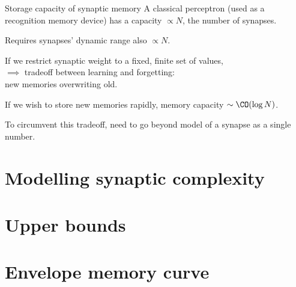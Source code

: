 \documentclass{beamer}%
\begin{document}

\begin{frame}{Storage capacity of synaptic memory}
%
  A classical perceptron (used as a recognition memory device) has a capacity $\propto N$, the number of synapses.

 \vp Requires synapses' dynamic range also $\propto N$.
 
 \vp If we restrict synaptic weight to a fixed, finite set of values,\\ 
 \hp $\implies$ tradeoff between learning and forgetting:\\
 \hp new memories overwriting old.
 
 \vp If we wish to store new memories rapidly, memory capacity  $\sim\CO(\log N)$.
 \\ 

 \vp To circumvent this tradeoff, need to go beyond model of a synapse as a single number.
%
\end{frame}


\section{Modelling synaptic complexity}




\section{Upper bounds}




\section{Envelope memory curve}

\end{document}
